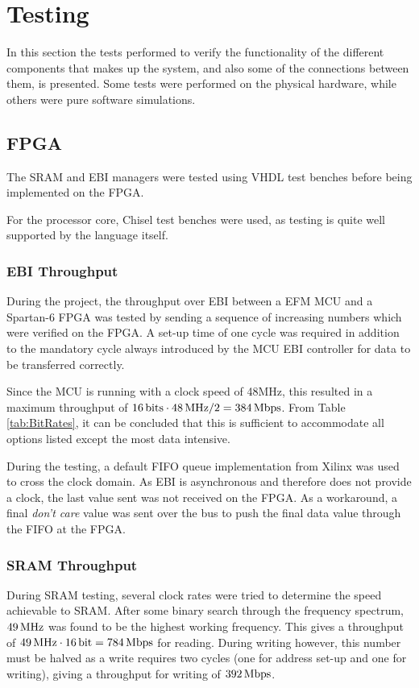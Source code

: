 \section{Testing}

In this section the tests performed to verify the functionality of the different components that makes up the system, and also some of the connections between them, is presented.
Some tests were performed on the physical hardware, while others were pure software simulations.

\subsection{FPGA}
The SRAM and EBI managers were tested using VHDL test benches before being implemented on the FPGA.

For the processor core, Chisel test benches were used, as testing is quite well supported by the language itself.

\subsubsection{EBI Throughput} \label{subsec:EbiThroughput}
During the project, the throughput over EBI between a EFM MCU and a Spartan-6 FPGA was tested by sending a sequence of increasing numbers which were verified on the FPGA.
A set-up time of one cycle was required in addition to the mandatory cycle always introduced by the MCU EBI controller for data to be transferred correctly.

Since the MCU is running with a clock speed of 48MHz, this resulted in a maximum throughput of $\unit[16]{bits} \cdot \unit[48]{MHz} / 2 = \unit[384]{Mbps}$.
From Table \ref{tab:BitRates}, it can be concluded that this is sufficient to accommodate all options listed except the most data intensive.

During the testing, a default FIFO queue implementation from Xilinx was used to cross the clock domain.
As EBI is asynchronous and therefore does not provide a clock, the last value sent was not received on the FPGA.
As a workaround, a final \textit{don't care} value was sent over the bus to push the final data value through the FIFO at the FPGA.

\subsubsection{SRAM Throughput} \label{subsec:SramThroughput}
During SRAM testing, several clock rates were tried to determine the speed achievable to SRAM.
After some binary search through the frequency spectrum, $\unit[49]{MHz}$ was found to be the highest working frequency.
This gives a throughput of $\unit[49]{MHz}\cdot\unit[16]{bit} = \unit[784]{Mbps}$ for reading.
During writing however, this number must be halved as a write requires two cycles (one for address set-up and one for writing), giving a throughput for writing of $\unit[392]{Mbps}$.

